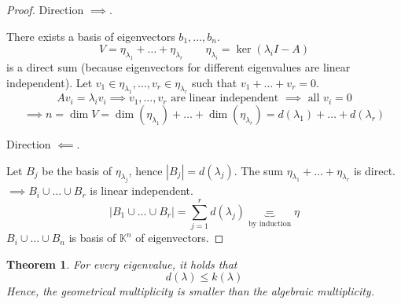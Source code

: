 \documentclass{article}
\newtheorem{theorem}{Theorem}  \numberwithin{theorem}{section}
\newcommand{\card}[1]{\left|#1\right|}
\begin{document}
\begin{proof}
  Direction $\implies$.

  There exists a basis of eigenvectors $b_1, \dots, b_n$.
  \[ V = \eta_{\lambda_1} + \dots + \eta_{\lambda_r} \qquad \eta_{\lambda_i} = \ker(\lambda_i I - A) \]
  is a direct sum (because eigenvectors for different eigenvalues are linear independent).
  Let $v_1 \in \eta_{\lambda_1}, \dots, v_r \in \eta_{\lambda_r}$ such that $v_1 + \dots + v_r = 0$.
  \[ A v_i = \lambda_i v_i \implies v_1, \dots, v_r \text{ are linear independent } \implies \text{ all } v_i = 0 \]
  \[ \implies n = \dim{V} = \dim(\eta_{\lambda_1}) + \dots + \dim(\eta_{\lambda_r}) = d(\lambda_1) + \dots + d(\lambda_r) \]

  Direction $\impliedby$.

  Let $B_j$ be the basis of $\eta_{\lambda_j}$, hence $\card{B_j} = d(\lambda_j)$.
  The sum $\eta_{\lambda_1} + \dots + \eta_{\lambda_r}$ is direct.
  $\implies B_i \cup \dots \cup B_r$ is linear independent.
  \[ \card{B_1 \cup \dots \cup B_r} = \sum_{j=1}^r d(\lambda_j) \underbrace{=}_{\text{by induction}} \eta \]
  $B_i \cup \dots \cup B_n$ is basis of $\mathbb K^n$ of eigenvectors.
\end{proof}

\begin{theorem} %
  For every eigenvalue, it holds that
  \[ d(\lambda) \leq k(\lambda) \]
  Hence, the geometrical multiplicity is smaller than the algebraic multiplicity.
\end{theorem}
\end{document}
